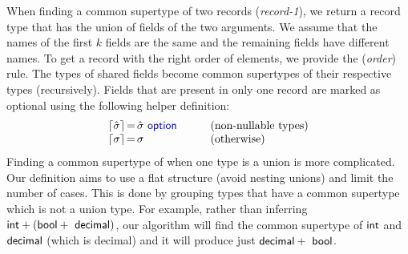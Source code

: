 \documentclass[preprint]{sigplanconf}
\newcommand{\kvd}[1]{\textnormal{\textcolor{kvdclr}{\sffamily #1}}}
\newcommand{\ident}[1]{\textnormal{\sffamily #1}}
\newcommand{\narrow}[1]{\hspace{-0.85em} #1 \hspace{-0.85em}}
\newcommand{\addopt}[1]{\lceil#1\rceil}
\begin{document}
\noindent
When finding a common supertype of two records (\emph{record-1}), we return a record type that has the union
of fields of the two arguments. We assume that the names of the first $k$ fields are the same and the
remaining fields have different names. To get a record with the right order of elements, we provide the
(\emph{order}) rule. The types of shared fields become common supertypes of their 
respective types (recursively). Fields that are present in only one record are marked as optional using
the following helper definition:
%
\begin{equation*}
\begin{array}{rcll}
 \addopt{\hat{\sigma}} &\narrow{=}& \hat{\sigma}~\kvd{option} \qquad&(\textnormal{non-nullable types})\\
 \addopt{\sigma} &\narrow{=}& \sigma &(\textnormal{otherwise})
\end{array}
\end{equation*}
%
Finding a common supertype of when one type is a union is more complicated. Our definition aims to 
use a flat structure (avoid nesting unions) and limit the number of cases. This is done by grouping
types that have a common supertype which is not a union type. For example, rather than inferring 
$\ident{int} + (\ident{bool} + \ident{decimal})$, our algorithm will find the common supertype of
$\ident{int}$ and $\ident{decimal}$ (which is \ident{decimal}) and it will produce just $\ident{decimal}+\ident{bool}$.
\end{document}

